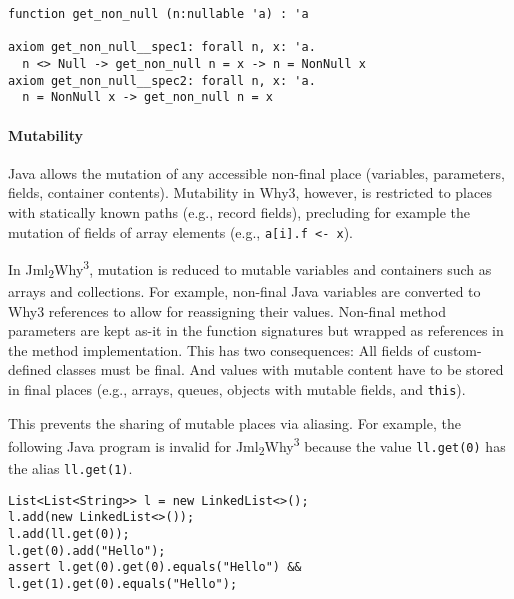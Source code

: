 \documentclass[a4paper]{report}
\newcommand{\cref}[1]{Section~\ref{#1}}
\newcommand{\jmlwhy}{\texorpdfstring{Jml\textsubscript{2}Why\textsuperscript{3}}{Jml2Why3}}
\begin{document}
\begin{lstlisting}
function get_non_null (n:nullable 'a) : 'a

axiom get_non_null__spec1: forall n, x: 'a.
  n <> Null -> get_non_null n = x -> n = NonNull x
axiom get_non_null__spec2: forall n, x: 'a.
  n = NonNull x -> get_non_null n = x
\end{lstlisting}

\paragraph{Mutability}
\label{sec:mutability}

Java allows the mutation of any accessible non-final place (variables,
parameters, fields, container contents). Mutability in Why3, however, is
restricted to places with statically known paths (e.g., record fields),
precluding for example the mutation of fields of array elements (e.g.,
\lstinline{a[i].f <- x}).

In \jmlwhy{}, mutation is reduced to mutable variables and containers such as
arrays and collections. For example, non-final Java variables are converted to
Why3 references to allow for reassigning their values. Non-final method
parameters are kept as-it in the function signatures but wrapped as references
in the method implementation. This has two consequences: All fields of
custom-defined classes must be final. And values with mutable content have to be
stored in final places (e.g., arrays, queues, objects with mutable fields, and
\texttt{this}).

This prevents the sharing of mutable places via aliasing. For example, the
following Java program is invalid for \jmlwhy{} because the value
\lstinline{ll.get(0)} has the alias \lstinline{ll.get(1)}.
\begin{lstlisting}
List<List<String>> l = new LinkedList<>();
l.add(new LinkedList<>());
l.add(ll.get(0));
l.get(0).add("Hello");
assert l.get(0).get(0).equals("Hello") && l.get(1).get(0).equals("Hello");
\end{lstlisting}

\end{document}
